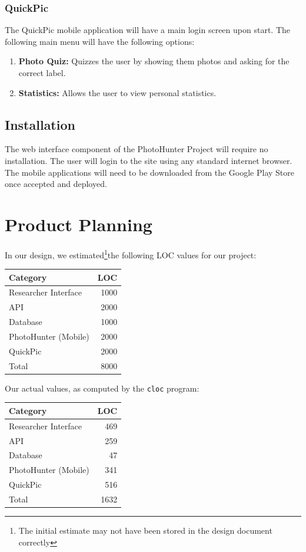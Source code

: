 \documentclass{article}
\begin{document}
\subsubsection{QuickPic}
The QuickPic mobile application will have a main login screen upon start. The
following main menu will have the following options:

\begin{enumerate}

  \item \textbf {Photo Quiz:} Quizzes the user by showing them photos and
        asking for the correct label.

  \item \textbf{Statistics:} Allows the user to view personal statistics.

\end{enumerate}

\subsection{Installation}
The web interface component of the PhotoHunter Project will require no
installation. The user will login to the site using any standard internet
browser. The mobile applications will need to be downloaded from the Google
Play Store once accepted and deployed.



\section{Product Planning}
In our design, we estimated\footnote{The initial estimate may not have been stored in the design document correctly}the following LOC values for our project:

\begin{center}
\begin{tabular}{l|r}
  Category & LOC \\
  \hline
  Researcher Interface & 1000 \\
  API & 2000 \\
  Database & 1000 \\
  PhotoHunter (Mobile) & 2000 \\
  QuickPic & 2000 \\
  \hline
  Total & 8000
\end{tabular}
\end{center}

Our actual values, as computed by the \texttt{cloc} program:

\begin{center}
  \begin{tabular}{l|r}
    Category & LOC \\
    \hline
    Researcher Interface & 469 \\
    API & 259 \\
    Database & 47 \\
    PhotoHunter (Mobile) & 341 \\
    QuickPic & 516 \\
    \hline
    Total & 1632
  \end{tabular}
\end{center}
\end{document}

